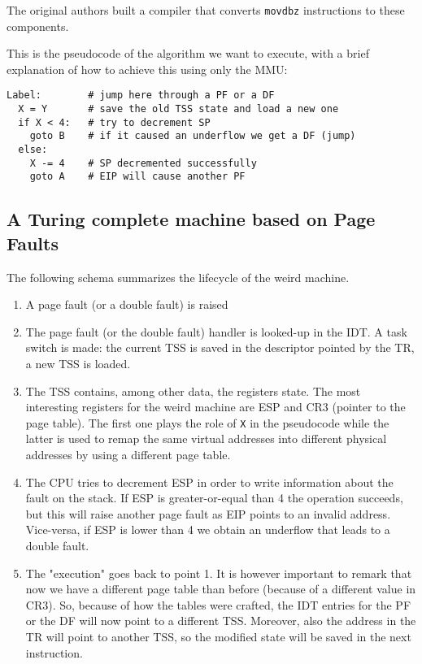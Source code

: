 \documentclass[11pt,twoside,a4paper]{article}
\begin{document}
The original authors built a compiler that converts \texttt{movdbz} instructions to these components. \cite{trapcc}

This is the pseudocode of the algorithm we want to execute, with a brief explanation of how to achieve this using only the MMU:
\begin{lstlisting}
Label:        # jump here through a PF or a DF
  X = Y       # save the old TSS state and load a new one
  if X < 4:   # try to decrement SP
    goto B    # if it caused an underflow we get a DF (jump)
  else:
    X -= 4    # SP decremented successfully
    goto A    # EIP will cause another PF
\end{lstlisting}


\subsection{A Turing complete machine based on Page Faults}

The following schema summarizes the lifecycle of the weird machine.

\begin{enumerate}
\item A page fault (or a double fault) is raised
\item The page fault (or the double fault) handler is looked-up in the IDT. A task switch is made: the current TSS is saved in the descriptor pointed by the TR, a new TSS is loaded.
\item The TSS contains, among other data, the registers state. The most interesting registers for the weird machine are ESP and CR3 (pointer to the page table). The first one plays the role of \texttt{X} in the pseudocode while the latter is used to remap the same virtual addresses into different physical addresses by using a different page table.
\item The CPU tries to decrement ESP in order to write information about the fault on the stack. If ESP is greater-or-equal than 4 the operation succeeds, but this will raise another page fault as EIP points to an invalid address. Vice-versa, if ESP is lower than 4 we obtain an underflow that leads to a double fault.
\item The "execution" goes back to point 1. It is however important to remark that now we have a different page table than before (because of a different value in CR3). So, because of how the tables were crafted, the IDT entries for the PF or the DF will now point to a different TSS. Moreover, also the address in the TR will point to another TSS, so the modified state will be saved in the next instruction.
\end{enumerate}
\end{document}

